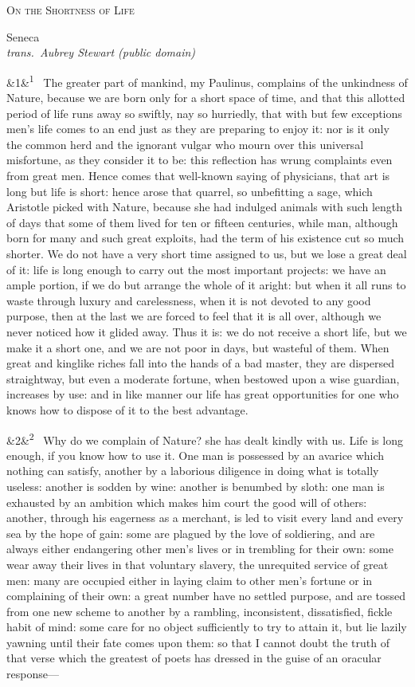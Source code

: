 \documentclass[12pt]{article}
\newcommand{\work}[1]{\begin{center}\LARGE\scshape #1\end{center}}
\newcommand{\attrib}[2]{\begin{center}\large #1\\[2pt]\small\itshape trans.\ #2\end{center}\vspace{1em}}
\newcommand{\para}[1][]{\par\noindent\ifx&#1&\else\textsuperscript{\footnotesize #1}~\fi}
\begin{document}
\work{On the Shortness of Life}
\attrib{Seneca}{Aubrey Stewart (public domain)}

\para[1] The greater part of mankind, my Paulinus, complains of the unkindness of Nature, because we are born only for a short space of time, and that this allotted period of life runs away so swiftly, nay so hurriedly, that with but few exceptions men’s life comes to an end just as they are preparing to enjoy it: nor is it only the common herd and the ignorant vulgar who mourn over this universal misfortune, as they consider it to be: this reflection has wrung complaints even from great men. Hence comes that well-known saying of physicians, that art is long but life is short: hence arose that quarrel, so unbefitting a sage, which Aristotle picked with Nature, because she had indulged animals with such length of days that some of them lived for ten or fifteen centuries, while man, although born for many and such great exploits, had the term of his existence cut so much shorter. We do not have a very short time assigned to us, but we lose a great deal of it: life is long enough to carry out the most important projects: we have an ample portion, if we do but arrange the whole of it aright: but when it all runs to waste through luxury and carelessness, when it is not devoted to any good purpose, then at the last we are forced to feel that it is all over, although we never noticed how it glided away. Thus it is: we do not receive a short life, but we make it a short one, and we are not poor in days, but wasteful of them. When great and kinglike riches fall into the hands of a bad master, they are dispersed straightway, but even a moderate fortune, when bestowed upon a wise guardian, increases by use: and in like manner our life has great opportunities for one who knows how to dispose of it to the best advantage.

\para[2] Why do we complain of Nature? she has dealt kindly with us. Life is long enough, if you know how to use it. One man is possessed by an avarice which nothing can satisfy, another by a laborious diligence in doing what is totally useless: another is sodden by wine: another is benumbed by sloth: one man is exhausted by an ambition which makes him court the good will of others: another, through his eagerness as a merchant, is led to visit every land and every sea by the hope of gain: some are plagued by the love of soldiering, and are always either endangering other men’s lives or in trembling for their own: some wear away their lives in that voluntary slavery, the unrequited service of great men: many are occupied either in laying claim to other men’s fortune or in complaining of their own: a great number have no settled purpose, and are tossed from one new scheme to another by a rambling, inconsistent, dissatisfied, fickle habit of mind: some care for no object sufficiently to try to attain it, but lie lazily yawning until their fate comes upon them: so that I cannot doubt the truth of that verse which the greatest of poets has dressed in the guise of an oracular response—
\end{document}
